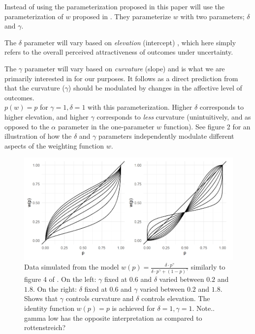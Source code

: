 \documentclass[12pt]{article}
\begin{document}
Instead of using the parameterization
proposed in \textcite{rottenstreich2001money}
this paper will use the parameterization
of $w$ proposed in \textcite{gonzalez1999shape}.
They parameterize $w$ with two parameters;
$\delta$ and $\gamma$.

\vspace{3mm}

The $\delta$ parameter will vary based on
\emph{elevation} (intercept)
\autocite{gonzalez1999shape},
which here simply refers to the overall
perceived attractiveness of outcomes
under uncertainty.

\vspace{3mm}

The $\gamma$ parameter will vary based on
\emph{curvature} (slope)
\autocite{gonzalez1999shape} and is what we
are primarily interested in for our purposes.
It follows as a direct prediction from
\textcite{rottenstreich2001money} that the
curvature ($\gamma$) should be modulated by changes in
the affective level of outcomes. \\

$p(w) = p$ for  $\gamma = 1, \delta = 1$
with this parameterization. Higher  $\delta$
corresponds to higher elevation, and
higher $\gamma$ corresponds to \emph{less}
curvature (unintuitively, and as opposed
to the $\alpha$ parameter in the one-parameter
$w$ function). See figure 2 for an
illustration of how the $\delta$
and $\gamma$ parameters independently modulate
different aspects of the weighting function $w$.

\begin{figure}[H]
	\includegraphics[width = \linewidth]{../Figures/Fig2.png}
	\caption{Data simulated from the model
		$w(p) = \frac{\delta \cdot p^{\gamma}}
	{\delta \cdot p^{\gamma} +
	(1-p)^{\gamma}}$ similarly to figure 4
	of \textcite{gonzalez1999shape}.
	On the left: $\gamma$ fixed at $0.6$
	and $\delta$ varied between $0.2$ and $1.8$.
	On the right: $\delta$ fixed at $0.6$
	and $\gamma$ varied between $0.2$ and $1.8$.
	Shows that $\gamma$  controls
	curvature and $\delta$ controls
	elevation. The identity function $w(p) = p$
	is achieved for $\delta = 1, \gamma = 1$.
	Note.. gamma low has the opposite interpretation
	as compared to rottenstreich?}
\end{figure}
\end{document}
